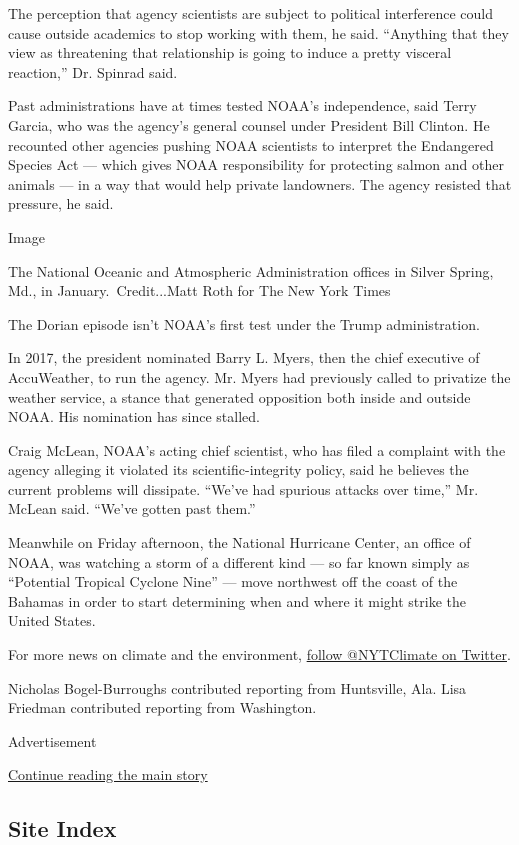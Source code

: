The perception that agency scientists are subject to political
interference could cause outside academics to stop working with them, he
said. ``Anything that they view as threatening that relationship is
going to induce a pretty visceral reaction,'' Dr. Spinrad said.

Past administrations have at times tested NOAA's independence, said
Terry Garcia, who was the agency's general counsel under President Bill
Clinton. He recounted other agencies pushing NOAA scientists to
interpret the Endangered Species Act --- which gives NOAA responsibility
for protecting salmon and other animals --- in a way that would help
private landowners. The agency resisted that pressure, he said.

Image

The National Oceanic and Atmospheric Administration offices in Silver
Spring, Md., in January.~Credit...Matt Roth for The New York Times

The Dorian episode isn't NOAA's first test under the Trump
administration.

In 2017, the president nominated Barry L. Myers, then the chief
executive of AccuWeather, to run the agency. Mr. Myers had previously
called to privatize the weather service, a stance that generated
opposition both inside and outside NOAA. His nomination has since
stalled.

Craig McLean, NOAA's acting chief scientist, who has filed a complaint
with the agency alleging it violated its scientific-integrity policy,
said he believes the current problems will dissipate. ``We've had
spurious attacks over time,'' Mr. McLean said. ``We've gotten past
them.''

Meanwhile on Friday afternoon, the National Hurricane Center, an office
of NOAA, was watching a storm of a different kind --- so far known
simply as ``Potential Tropical Cyclone Nine'' --- move northwest off the
coast of the Bahamas in order to start determining when and where it
might strike the United States.

For more news on climate and the environment,
\href{https://twitter.com/nytclimate}{follow @NYTClimate on Twitter}.

Nicholas Bogel-Burroughs contributed reporting from Huntsville, Ala.
Lisa Friedman contributed reporting from Washington.

Advertisement

\protect\hyperlink{after-bottom}{Continue reading the main story}

\hypertarget{site-index}{%
\subsection{Site Index}\label{site-index}}

